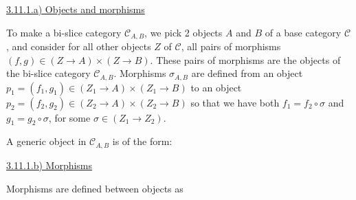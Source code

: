 \documentclass[12pt, letterpaper, twoside]{report}
\begin{document}
\vspace{5mm}
\underline{3.11.1.a) Objects and morphisms}

To make a bi-slice category $\mathcal{C}_{A,B}$, we pick 2 objects $A$ and $B$ of a base category $\mathcal{C}$, and consider for all other objects $Z$ of $\mathcal{C}$, all pairs of morphisms $(f, g) \in (Z \to A) \times (Z \to B)$. These pairs of morphisms are the objects of the bi-slice category $\mathcal{C}_{A,B}$. Morphisms $\sigma_{A,B}$ are defined from an object $p_1 = (f_1, g_1) \in (Z_1 \to A) \times (Z_1 \to B)$ to an object $p_2 = (f_2, g_2) \in (Z_2 \to A) \times (Z_2 \to B)$ so that we have both $f_1 = f_2 \circ \sigma$ and $g_1 = g_2 \circ \sigma$, for some $\sigma \in (Z_1 \to Z_2)$.

A generic object in $\mathcal{C}_{A,B}$ is of the form:



\vspace{5mm}
\underline{3.11.1.b) Morphisms}

Morphisms are defined between objects as

\end{document}

